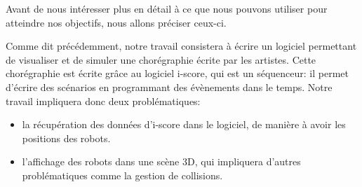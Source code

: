 Avant de nous intéresser plus en détail à ce que nous pouvons utiliser pour atteindre nos objectifs, nous allons préciser ceux-ci.

Comme dit précédemment, notre travail consistera à écrire un logiciel permettant de visualiser et de simuler une chorégraphie écrite par les artistes. Cette chorégraphie est écrite grâce au logiciel i-score, qui est un séquenceur: il permet d'écrire des scénarios en programmant des évènements dans le temps. Notre travail impliquera donc deux problématiques: 
\begin{itemize}
\item la récupération des données d'i-score dans le logiciel, de manière à avoir les positions des robots.
\item l'affichage des robots dans une scène 3D, qui impliquera d'autres problématiques comme la gestion de collisions.
\end{itemize} 

